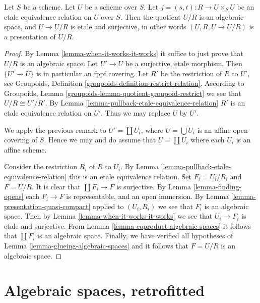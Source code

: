 \begin{theorem}
\label{theorem-presentation}
Let $S$ be a scheme. Let $U$ be a scheme over $S$.
Let $j = (s, t) : R \to U \times_S U$
be an etale equivalence relation on $U$ over $S$.
Then the quotient $U/R$ is an algebraic space,
and $U \to U/R$ is etale and surjective, in other words
$(U, R, U \to U/R)$ is a presentation of $U/R$.
\end{theorem}

\begin{proof}
By Lemma \ref{lemma-when-it-works-it-works}
it suffice to just prove that $U/R$ is an algebraic space.
Let $U' \to U$ be a surjective, etale morphism.
Then $\{U' \to U\}$ is in particular an fppf covering.
Let $R'$ be the restriction of $R$ to $U'$, see
Groupoids, Definition \ref{groupoids-definition-restrict-relation}.
According to
Groupoids, Lemma \ref{groupoids-lemma-quotient-groupoid-restrict}
we see that $U/R \cong U'/R'$.
By Lemma \ref{lemma-pullback-etale-equivalence-relation} $R'$ is an
etale equivalence relation on $U'$. Thus we may replace $U$ by $U'$.

\medskip\noindent
We apply the previous remark to $U' = \coprod U_i$, where
$U = \bigcup U_i$ is an affine open covering of $S$. Hence we
may and do assume that $U = \coprod U_i$ where
each $U_i$ is an affine scheme.

\medskip\noindent
Consider the restriction $R_i$ of $R$ to $U_i$.
By Lemma \ref{lemma-pullback-etale-equivalence-relation}
this is an etale equivalence relation.
Set $F_i = U_i/R_i$ and $F = U/R$.
It is clear that $\coprod F_i \to F$ is surjective.
By Lemma \ref{lemma-finding-opens} each $F_i \to F$
is representable, and an open immersion.
By Lemma \ref{lemma-presentation-quasi-compact}
applied to $(U_i, R_i)$ we see that $F_i$ is an algebraic space.
Then by Lemma \ref{lemma-when-it-works-it-works} we see that
$U_i \to F_i$ is etale and surjective.
From Lemma \ref{lemma-coproduct-algebraic-spaces}
it follows that $\coprod F_i$ is an algebraic space.
Finally, we have verified all
hypotheses of Lemma \ref{lemma-glueing-algebraic-spaces}
and it follows that $F = U/R$ is an algebraic space.
\end{proof}










\section{Algebraic spaces, retrofitted}
\label{section-algebraic-spaces-retrofitted}

